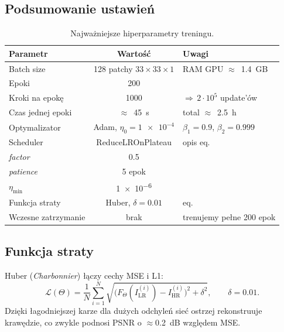 \documentclass[11pt]{article}
\begin{document}
\subsection{Podsumowanie ustawień}

\begin{table}[h]
\centering
\begin{tabular}{@{}lcl@{}}
\toprule
\textbf{Parametr} & \textbf{Wartość} & \textbf{Uwagi} \\ \midrule

Batch size                & 128 patchy $33{\times}33{\times}1$ & RAM GPU $\approx$~\SI{1.4}{GB} \\
Epoki                     & 200 & \\
Kroki na epokę            & 1000 & $\Rightarrow\,2{\cdot}10^{5}$ update’ów \\
Czas jednej epoki         & $\approx$~\SI{45}{s} & total $\approx$~\SI{2.5}{h} \\[4pt]

Optymalizator             & Adam, $\eta_0 = \num{1e-4}$ & $\beta_1{=}0.9$, $\beta_2{=}0.999$ \\
Scheduler                 & \textsf{ReduceLROnPlateau} & opis eq. \\
\quad \textit{factor}     & 0.5 & \\
\quad \textit{patience}   & 5 epok & \\
\quad $\eta_{\text{min}}$ & \num{1e-6} & \\[4pt]

Funkcja straty            & Huber, $\delta = 0.01$ & eq. \\
Wczesne zatrzymanie       & brak & trenujemy pełne 200 epok \\

\bottomrule
\end{tabular}
\caption{Najważniejsze hiperparametry treningu.}
\label{tab:hparams}
\end{table}

\subsection{Funkcja straty}

Huber (\textit{Charbonnier}) łączy cechy MSE i L1:
\begin{equation}
  \mathcal L(\Theta)=
  \frac{1}{N}\sum_{i=1}^{N}
  \sqrt{\bigl(F_\Theta(I^{(i)}_\mathrm{LR})-
              I^{(i)}_\mathrm{HR}\bigr)^{2}+\delta^{2}},
  \qquad \delta=0.01.
  \label{eq:huber}
\end{equation}
Dzięki łagodniejszej karze dla dużych odchyleń sieć ostrzej rekonstruuje
krawędzie, co zwykle podnosi PSNR o \(\approx\)\SI{0.2}{dB} względem MSE.
\end{document}
